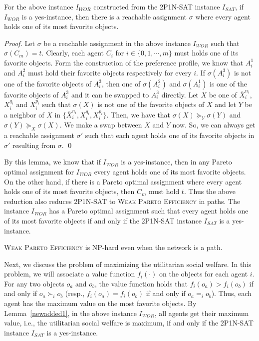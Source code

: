 \begin{lemma}\label{newadded1}
For the above instance $I_{WOR}$ constructed from the \textsc{2P1N-SAT} instance $I_{SAT}$, if $I_{WOR}$ is a yes-instance, then there is a reachable assignment $\sigma$ where every agent holds one of its most favorite objects.
\end{lemma}
\begin{proof}
    Let $\sigma$ be a reachable assignment in the above instance $I_{WOR}$ such that $\sigma (C_m)=t$.
    Clearly, each agent $C_i$ for $i\in\{ 0,1,\cdots,m\}$ must holds one of its favorite objects.
    Form the construction of the preference profile, we know that $A_i^1$ and $A_i^2$ must hold their favorite objects respectively for every $i$.
    If $\sigma(A_i^3)$ is not one of the favorite objects of $A_i^3$, then one of $\sigma(A_i^2)$ and $\sigma(A_i^1)$ is one of the favorite objects of $A_i^3$ and it can be swapped to $A_i^3$ directly.
    Let $X$ be one of $\overline{X}_i^{n_i}$, $X_i^{q_i}$ and $X_i^{p_i}$ such that $\sigma(X)$ is not one of the favorite objects of $X$ and let $Y$ be a neighbor of $X$ in $\{\overline{X}_i^{n_i},X_i^{q_i},X_i^{p_i}\}$.
    Then, we have that $\sigma(X)\succeq_Y \sigma(Y)$ and $\sigma(Y)\succeq_X \sigma(X)$. We make a swap between $X$ and $Y$ now.
    So, we can always get a reachable assignment $\sigma'$ such that each agent holds one of its favorite objects in $\sigma'$ resulting from $\sigma$.
\qed
\end{proof}

By this lemma, we know that if $I_{WOR}$ is a yes-instance, then in any Pareto optimal assignment for $I_{WOR}$ every agent holds one of its most favorite objects.
On the other hand, if there is a Pareto optimal assignment where every agent holds one of its most favorite objects, then $C_m$ must hold $t$.
Thus the above reduction also reduces \textsc{2P1N-SAT} to \textsc{Weak Pareto Efficiency} in paths.
The instance $I_{WOR}$ has a Pareto optimal assignment such that every agent holds one of its most favorite objects if and only if the \textsc{2P1N-SAT} instance $I_{SAT}$ is a yes-instance.

\begin{theorem}
  \label{the_pareto}
  \textsc{Weak Pareto Efficiency} is NP-hard even when the network is a path.
\end{theorem}




Next, we discuss the problem of maximizing the utilitarian social welfare.
In this problem, we will associate a value function $f_i(\cdot)$ on the objects for each agent $i$.
For any two objects $o_a$ and $o_b$, the value function holds that $f_i(o_a)> f_i(o_b)$ if and only if $o_{a}\succ_i o_{b}$ (resp., $f_i(o_a)= f_i(o_b)$ if and only if $o_{a}=_i o_{b}$).
Thus, each agent has the maximum value on the most favorite objects.
By Lemma~\ref{newadded1}, in the above instance $I_{WOR}$, all agents get their maximum value, i.e., the utilitarian social welfare is maximum, if and only if the \textsc{2P1N-SAT} instance $I_{SAT}$ is a yes-instance.



